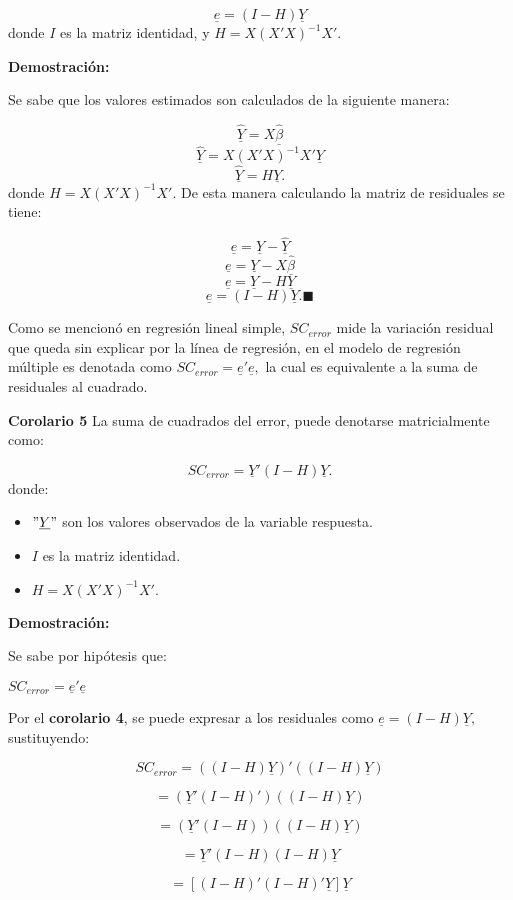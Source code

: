 \documentclass[a4paper,oneside,openany]{book}
\begin{document}
\[\underline{e}=(I-H)\underline{Y}\] donde \(I\) es la matriz identidad,
y \(H=X(X'X)^{-1}X'.\)

\textbf{Demostración:}

Se sabe que los valores estimados son calculados de la siguiente manera:

\[\underline{\hat{Y}}=X\underline{\hat{\beta}}\]
\[\underline{\hat{Y}}=X(X'X)^{-1}X'\underline{Y}\]
\[\underline{\hat{Y}}=H\underline{Y}.\] donde \(H=X(X'X)^{-1}X'.\) De
esta manera calculando la matriz de residuales se tiene:

\[\underline{e}=\underline{Y}-\underline{\hat{Y}}\]
\[\underline{e}=\underline{Y}-X\underline{\hat{\beta}}\]
\[\underline{e}=\underline{Y}-H\underline{Y}\]
\[\underline{e}=(I-H)\underline{Y}.\blacksquare\]

Como se mencionó en regresión lineal simple, \(SC_{error}\) mide la
variación residual que queda sin explicar por la línea de regresión, en
el modelo de regresión múltiple es denotada como
\(SC_{error}=\underline{e}'\underline{e},\) la cual es equivalente a la
suma de residuales al cuadrado.

\textbf{Corolario 5} La suma de cuadrados del error, puede denotarse
matricialmente como:

\[SC_{error}=\underline{Y}'(I-H)\underline{Y}.\] donde:

\begin{itemize}
\item
  \("\underline{Y}"\) son los valores observados de la variable
  respuesta.
\item
  \(I\) es la matriz identidad.
\item
  \(H=X(X'X)^{-1}X'.\)
\end{itemize}

\textbf{Demostración:}

Se sabe por hipótesis que:

\(SC_{error}=\underline{e}'\underline{e}\)

Por el \textbf{corolario 4}, se puede expresar a los residuales como
\(\underline{e}=(I-H)\underline{Y},\) sustituyendo:

\[SC_{error}=((I-H)\underline{Y})'((I-H)\underline{Y})\]

\[=(\underline{Y}'(I-H)')((I-H)\underline{Y})\]

\[=(\underline{Y}'(I-H))((I-H)\underline{Y})\]

\[=\underline{Y}'(I-H)(I-H)\underline{Y}\]

\[=[(I-H)'(I-H)'\underline{Y}]\underline{Y}\]
\end{document}
